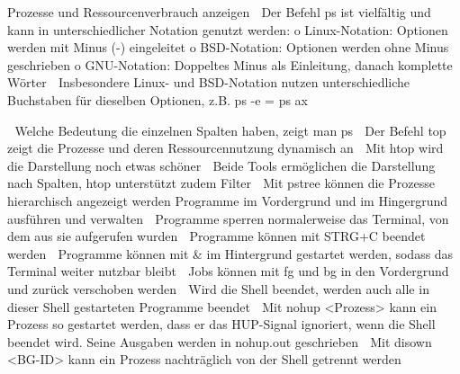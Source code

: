 Prozesse und Ressourcenverbrauch anzeigen
 Der Befehl ps ist vielfältig und kann in unterschiedlicher Notation genutzt werden:
o Linux-Notation: Optionen werden mit Minus (-) eingeleitet
o BSD-Notation: Optionen werden ohne Minus geschrieben
o GNU-Notation: Doppeltes Minus als Einleitung, danach komplette Wörter
 Insbesondere Linux- und BSD-Notation nutzen unterschiedliche Buchstaben für dieselben
Optionen, z.B. ps -e = ps ax

 Welche Bedeutung die einzelnen Spalten haben, zeigt man ps
 Der Befehl top zeigt die Prozesse und deren Ressourcennutzung dynamisch an
 Mit htop wird die Darstellung noch etwas schöner
 Beide Tools ermöglichen die Darstellung nach Spalten, htop unterstützt zudem Filter
 Mit pstree können die Prozesse hierarchisch angezeigt werden
Programme im Vordergrund und im Hingergrund ausführen und verwalten
 Programme sperren normalerweise das Terminal, von dem aus sie aufgerufen wurden
 Programme können mit STRG+C beendet werden
 Programme können mit & im Hintergrund gestartet werden, sodass das Terminal weiter
nutzbar bleibt
 Jobs können mit fg und bg in den Vordergrund und zurück verschoben werden
 Wird die Shell beendet, werden auch alle in dieser Shell gestarteten Programme beendet
 Mit nohup <Prozess> kann ein Prozess so gestartet werden, dass er das HUP-Signal ignoriert,
wenn die Shell beendet wird. Seine Ausgaben werden in nohup.out geschrieben
 Mit disown <BG-ID> kann ein Prozess nachträglich von der Shell getrennt werden